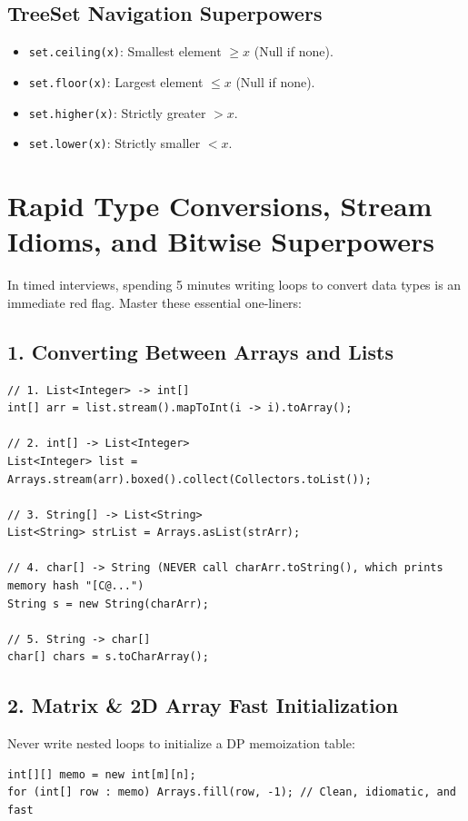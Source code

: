 \documentclass[10pt,journal,compsoc,onecolumn]{IEEEtran}
\begin{document}
\subsection{TreeSet Navigation Superpowers}
\begin{itemize}
    \item \texttt{set.ceiling(x)}: Smallest element $\ge x$ (Null if none).
    \item \texttt{set.floor(x)}: Largest element $\le x$ (Null if none).
    \item \texttt{set.higher(x)}: Strictly greater $> x$.
    \item \texttt{set.lower(x)}: Strictly smaller $< x$.
\end{itemize}

\section{Rapid Type Conversions, Stream Idioms, and Bitwise Superpowers}
\label{sec:conversions}

In timed interviews, spending 5 minutes writing loops to convert data types is an immediate red flag. Master these essential one-liners:

\subsection{1. Converting Between Arrays and Lists}
\begin{verbatim}
// 1. List<Integer> -> int[]
int[] arr = list.stream().mapToInt(i -> i).toArray();

// 2. int[] -> List<Integer>
List<Integer> list = Arrays.stream(arr).boxed().collect(Collectors.toList());

// 3. String[] -> List<String>
List<String> strList = Arrays.asList(strArr);

// 4. char[] -> String (NEVER call charArr.toString(), which prints memory hash "[C@...")
String s = new String(charArr);

// 5. String -> char[]
char[] chars = s.toCharArray();
\end{verbatim}

\subsection{2. Matrix \& 2D Array Fast Initialization}
Never write nested loops to initialize a DP memoization table:
\begin{verbatim}
int[][] memo = new int[m][n];
for (int[] row : memo) Arrays.fill(row, -1); // Clean, idiomatic, and fast
\end{verbatim}
\end{document}
